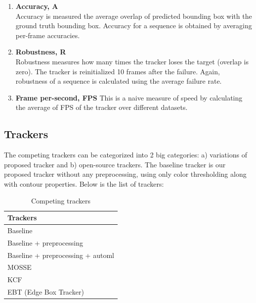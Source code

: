 \documentclass[fypca]{socreport}
\begin{document}
\begin{enumerate}

  \item \textbf{Accuracy, A} \\
  Accuracy is measured the average overlap of predicted bounding box with the
  ground truth bounding box. Accuracy for a sequence is obtained by averaging
  per-frame accuracies.
  
  \item \textbf{Robustness, R} \\
  Robustness measures how many times the tracker loses the target (overlap is
  zero). The tracker is reinitialized 10 frames after the failure. Again,
  robustness of a sequence is calculated using the average failure rate.

  \item \textbf{Frame per-second, FPS}
  This is a naive measure of speed by calculating the average of FPS of the
  tracker over different datasets.

\end{enumerate}

\subsection{Trackers}

The competing trackers can be categorized into 2 big categories: a) variations
of proposed tracker and b) open-source trackers. The baseline tracker is our
proposed tracker without any preprocessing, using only color thresholding along
with contour properties. Below is the list of trackers:

\begin{table}[H]
\centering
\begin{tabular}{|l|}
\hline
Trackers                           \\ \hline
Baseline                           \\ \hline
Baseline + preprocessing           \\ \hline
Baseline + preprocessing +  automl \\ \hline
MOSSE                              \\ \hline
KCF                                \\ \hline
EBT (Edge Box Tracker)             \\ \hline
\end{tabular}
\caption{Competing trackers}
\label{table:competing_trackers}
\end{table}
\end{document}
